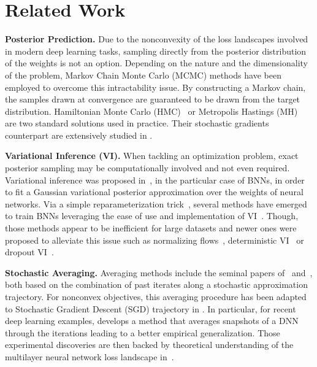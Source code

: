 \documentclass[tablecaption=bottom,wcp]{jmlr}
\begin{document}
\section{Related Work}\label{sec:related}

\textbf{Posterior Prediction.}
Due to the nonconvexity of the loss landscapes involved in modern deep learning tasks, sampling directly from the posterior distribution of the weights is not an option.
Depending on the nature and the dimensionality of the problem, Markov Chain Monte Carlo (MCMC) methods have been employed to overcome this intractability issue.
By constructing a Markov chain, the samples drawn at convergence are guaranteed to be drawn from the target distribution.
Hamiltonian Monte Carlo (HMC)~\citep{neal2011mcmc} or Metropolis Hastings (MH)~\citep{hastings1970monte} are two standard solutions used in practice.
Their stochastic gradients counterpart are extensively studied in \citep{ma2015complete}.

\vspace{0.08in}
\noindent \textbf{Variational Inference (VI).}
When tackling an optimization problem, exact posterior sampling may be computationally involved and not even required.
Variational inference was proposed in~\citep{graves2011practical}, in the particular case of BNNs, in order to fit a Gaussian variational posterior approximation over the weights of neural networks.
Via a simple reparameterization trick~\citep{blundell2015weight}, several methods have emerged to train BNNs leveraging the ease of use and implementation of VI~\citep{kingma2015variational,blundell2015weight,molchanov2017variational}.
Though, those methods appear to be inefficient for large datasets and newer ones were proposed to alleviate this issue such as normalizing flows~\citep{louizos2017multiplicative}, deterministic VI~\citep{wu2018deterministic} or dropout VI~\citep{gal2016dropout}.

\vspace{0.08in}
\noindent \textbf{Stochastic Averaging.}
Averaging methods include the seminal papers of~\citep{polyak1990sa} and~\citep{ruppert1988efficient}, both based on the combination of past iterates along a stochastic approximation trajectory.
For nonconvex objectives, this averaging procedure has been adapted to Stochastic Gradient Descent (SGD) trajectory in \citep{zhou2017convergence}.
In particular, for recent deep learning examples, \citet{izmailov2018averaging} develops a  method that averages snapshots of a DNN through the iterations leading to a better empirical generalization.
Those experimental discoveries are then backed by theoretical understanding of the multilayer neural network loss landscape in~\citep{keskar2016large,he2019asymmetric}.
\end{document}
